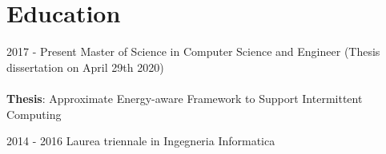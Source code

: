 \documentclass[letterpaper]{twentysecondcv} %
\begin{document}
\makeprofile %

\section{Education}
\begin{twenty}
	\twentyitem
	{2017 -}
	{Present}
	{Master of Science in Computer Science and Engineer}
	{}
	{
	(Thesis dissertation on April 29th 2020)\\ \\
	{
	\textbf{Thesis}: Approximate Energy-aware Framework to Support Intermittent Computing
	}
	}
	{\footnotesize{}}

	\twentyitem
	{2014 - 2016}
	{}
	{Laurea triennale in Ingegneria Informatica}
	{}
	{}
	{\footnotesize{}}
\end{twenty}


\end{document}
